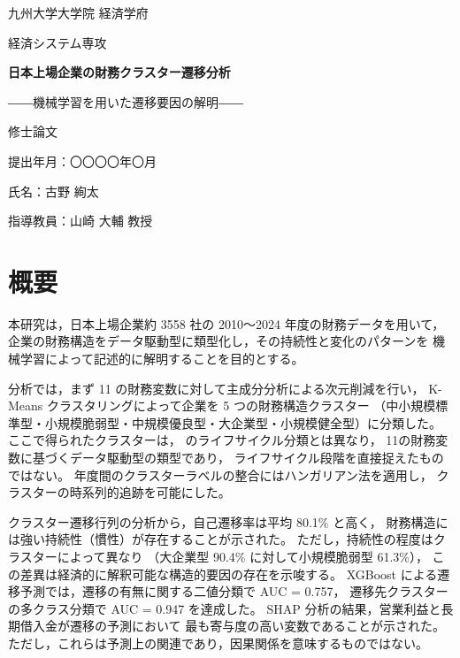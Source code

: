 \documentclass[
  book,                     %
  paper        = a4,
  fontsize     = 11pt,      %
  head_space   = 25mm,      %
  foot_space   = 25mm,      %
  gutter       = 30mm,      %
  fore-edge    = 25mm,      %
  line_length  = 42zw,      %
  number_of_lines = 38,     %
  titlepage,
  twoside,
]{jlreq}
\begin{document}

\begin{titlepage}
  \centering
  \vspace*{40mm}
  {\Large 九州大学大学院 経済学府\par}
  \vspace{8mm}
  {\large 経済システム専攻\par}
  \vspace{20mm}
  {\LARGE\bfseries 日本上場企業の財務クラスター遷移分析\par}
  \vspace{6mm}
  {\large ――機械学習を用いた遷移要因の解明――\par}
  \vspace{30mm}
  {\large 修士論文\par}
  \vspace{20mm}
  {\large 提出年月：〇〇〇〇年〇月\par}
  \vspace{10mm}
  {\large 氏名：古野 絢太\par}
  \vspace{6mm}
  {\large 指導教員：山崎 大輔 教授\par}
  \vfill
\end{titlepage}

\cleardoublepage
\chapter*{概要}

\bigskip

本研究は，日本上場企業約 \num{3558} 社の 2010〜2024 年度の財務データを用いて，
企業の財務構造をデータ駆動型に類型化し，その持続性と変化のパターンを
機械学習によって記述的に解明することを目的とする。

分析では，まず 11 の財務変数に対して主成分分析による次元削減を行い，
K-Means クラスタリングによって企業を 5 つの財務構造クラスター
（中小規模標準型・小規模脆弱型・中規模優良型・大企業型・小規模健全型）に分類した。
ここで得られたクラスターは， のライフサイクル分類とは異なり，
11の財務変数に基づくデータ駆動型の類型であり，
ライフサイクル段階を直接捉えたものではない。
年度間のクラスターラベルの整合にはハンガリアン法を適用し，
クラスターの時系列的追跡を可能にした。

クラスター遷移行列の分析から，自己遷移率は平均 80.1\% と高く，
財務構造には強い持続性（慣性）が存在することが示された。
ただし，持続性の程度はクラスターによって異なり
（大企業型 90.4\% に対して小規模脆弱型 61.3\%），
この差異は経済的に解釈可能な構造的要因の存在を示唆する。
XGBoost による遷移予測では，遷移の有無に関する二値分類で AUC = 0.757，
遷移先クラスターの多クラス分類で AUC = 0.947 を達成した。
SHAP 分析の結果，営業利益と長期借入金が遷移の予測において
最も寄与度の高い変数であることが示された。
ただし，これらは予測上の関連であり，因果関係を意味するものではない。
\end{document}
